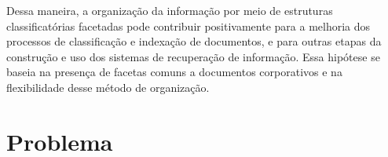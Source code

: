 




Dessa maneira, a organização da informação por meio de estruturas classificatórias facetadas pode contribuir positivamente para a melhoria dos processos de classificação e indexação de documentos, e para outras etapas da construção e uso dos sistemas de recuperação de informação. Essa hipótese se baseia na presença de facetas comuns a documentos corporativos e na flexibilidade desse método de organização.









\section{Problema}

